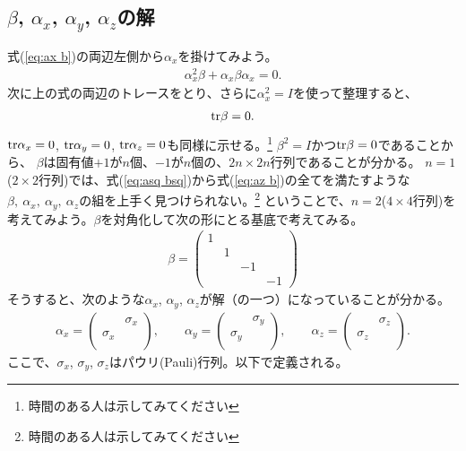 \documentclass[10pt,a4paper]{jarticle}
\begin{document}
\subsection{$\beta$, $\alpha_x$, $\alpha_y$, $\alpha_z$の解}
式(\ref{eq:ax b})の両辺左側から$\alpha_x$を掛けてみよう。
\begin{align}
\alpha_x^2 \beta + \alpha_x \beta \alpha_x = 0.
\end{align}
次に上の式の両辺のトレースをとり、さらに$\alpha_x^2 = I$を使って整理すると、
\begin{align}
{\rm tr}\beta = 0.
\end{align}
${\rm tr} \alpha_x = 0$, ${\rm tr} \alpha_y = 0$, ${\rm tr} \alpha_z = 0$も同様に示せる。\footnote{時間のある人は示してみてください}
$\beta^2 = I$かつ${\rm tr}\beta = 0$であることから、
$\beta$は固有値$+1$が$n$個、$-1$が$n$個の、$2n \times 2n$行列であることが分かる。
$n=1$($2\times 2$行列)では、式(\ref{eq:asq bsq})から式(\ref{eq:az b})の全てを満たすような$\beta,~\alpha_x,~\alpha_y,~\alpha_z$の組を上手く見つけられない。\footnote{時間のある人は示してみてください}
ということで、$n=2$($4\times 4$行列)を考えてみよう。$\beta$を対角化して次の形にとる基底で考えてみる。
\begin{align}
\beta = \left(\begin{array}{cccc}
1 &&& \\
& 1 && \\
&& -1 & \\
&&& -1
\end{array}\right)
\end{align}
%
そうすると、次のような$\alpha_x$, $\alpha_y$, $\alpha_z$が解（の一つ）になっていることが分かる。
\begin{align}
\alpha_x = \left(\begin{array}{cc}
& \sigma_x \\
\sigma_x & \\
\end{array}\right), \qquad
%
\alpha_y = \left(\begin{array}{cc}
& \sigma_y \\
\sigma_y & \\
\end{array}\right), \qquad
%
\alpha_z = \left(\begin{array}{cc}
& \sigma_z \\
\sigma_z & \\
\end{array}\right).
\end{align}
ここで、$\sigma_x$, $\sigma_y$, $\sigma_z$はパウリ(Pauli)行列。以下で定義される。
\end{document}

